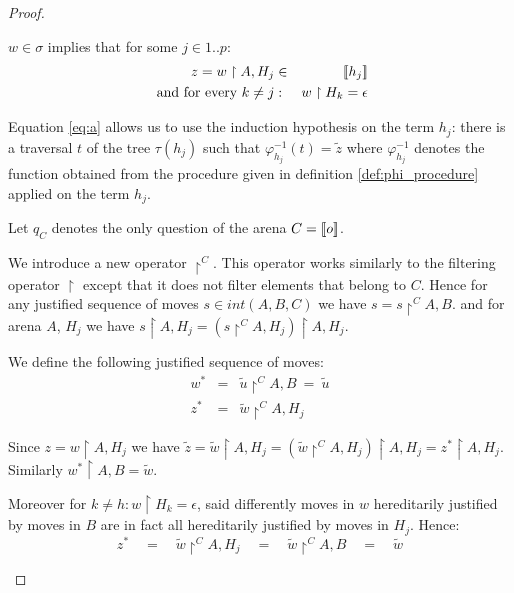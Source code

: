 \begin{proof}
\begin{itemize}
\begin{itemize}
        $w \in \sigma$ implies that for some $j \in 1..p$:
        \begin{eqnarray}
          z = w \upharpoonright A, H_j &\in& {[\![ h_j ]\!]}  \label{eq:def_z} \\
          \mbox{ and for every } k\neq j &:& w \upharpoonright H_k = \epsilon \label{eq:b}
        \end{eqnarray}

        Equation \ref{eq:a} allows us to use the induction hypothesis on the term $h_j$:
        there is a traversal $t$ of the tree $\tau(h_j)$ such that $\varphi^{-1}_{h_j}(t) = \tilde{z}$
        where $\varphi^{-1}_{h_j}$ denotes the function obtained from the procedure
        given in definition \ref{def:phi_procedure} applied on the term $h_j$.

        Let $q_C$ denotes the only question of the arena $C = {[\![ o ]\!]}$.

        We introduce a new operator $\upharpoonright^C$. This operator works similarly
        to the filtering operator $\upharpoonright$ except that it does not filter
        elements that belong to $C$.
        Hence for any justified sequence of moves $s \in int(A,B,C)$
        we have $s  = s \upharpoonright^C A,B$.
        and for arena $A$, $H_j$ we have $s\upharpoonright A, H_j =
        (s\upharpoonright^C A, H_j) \upharpoonright A, H_j $.

        We define the following justified sequence of moves:
        \begin{eqnarray}
            w^\ast &=& \tilde{u} \upharpoonright^C A,B \ =\  \tilde{u} \label{eq:def_wstar} \\
            z^\ast &=& \tilde{w} \upharpoonright^C A, H_j \label{eq:def_zstar}
        \end{eqnarray}

        Since $z = w \upharpoonright A, H_j$ we have
        $\tilde{z} = \tilde{w} \upharpoonright A, H_j = (\tilde{w} \upharpoonright^C A,H_j) \upharpoonright A, H_j
        = z^\ast \upharpoonright A, H_j$. Similarly $w^\ast \upharpoonright A,B =\tilde{w}$.


        Moreover for $k\neq h : w \upharpoonright H_k = \epsilon$, said differently
        moves in $w$ hereditarily justified by moves in $B$ are in fact all
        hereditarily justified by moves in $H_j$.  Hence:
        \begin{equation}
         z^\ast \quad=\quad \tilde{w} \upharpoonright^C A, H_j \quad = \quad \tilde{w} \upharpoonright^C A, B  \quad = \quad  \tilde{w}
        \end{equation}



\end{itemize}
\end{itemize}
\end{proof}

